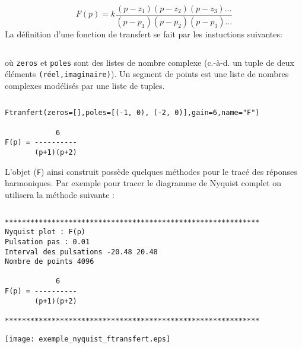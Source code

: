 \[
F(p)=k\dfrac{(p-z_1)(p-z_2)(p-z_3)\ldots}{(p-p_1)(p-p_2)(p-p_3)\ldots}
\]
La définition d'une fonction de transfert se fait par les instuctions
suivantes:
\inputminted{python}{codes/python/annexe_cauchy_cellule2.py}
où \texttt{zeros} et \texttt{poles} sont des listes de nombre complexe 
(c.-à-d. un tuple de deux éléments \texttt{(réel,imaginaire)}).
Un segment de points est une liste de nombres complexes modélisés par 
une liste de tuples.
\begin{tcolorbox}[breakable, size=fbox, boxrule=1pt, 
pad at break*=1mm,colback=cellbackground, colframe=cellborder]
\inputminted{python}{codes/python/annexe_cauchy_cellule2.py}
\end{tcolorbox}
\begin{Verbatim}[commandchars=\\\{\}]
Ftranfert(zeros=[],poles=[(-1, 0), (-2, 0)],gain=6,name="F")

            6
F(p) = ----------
       (p+1)(p+2)

\end{Verbatim}

L'objet (\texttt{F}) ainsi construit possède quelques méthodes pour
le tracé des réponses harmoniques. Par exemple pour tracer le diagramme de 
Nyquist complet on utilisera la méthode suivante :
\begin{tcolorbox}[breakable, size=fbox, boxrule=1pt, 
    pad at break*=1mm,colback=cellbackground, colframe=cellborder]
\inputminted{python}{codes/python/annexe_cauchy_cellule3.py}
\end{tcolorbox}

\begin{Verbatim}[commandchars=\\\{\}]
************************************************************
Nyquist plot : F(p)
Pulsation pas : 0.01
Interval des pulsations -20.48 20.48
Nombre de points 4096

            6
F(p) = ----------
       (p+1)(p+2)

************************************************************
\end{Verbatim}
\begin{center}
    \texttt{[image: exemple\_nyquist\_ftransfert.eps]}
\end{center}
